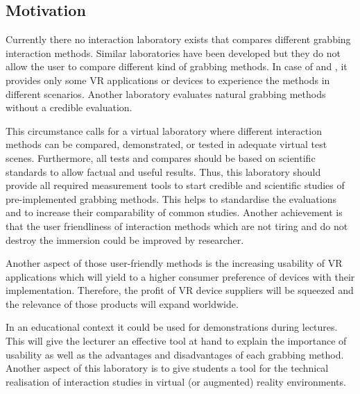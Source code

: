 \subsection{Motivation}\label{sec:Motivation}
Currently there no interaction laboratory exists that compares different grabbing interaction methods. Similar laboratories \cite{lin2016towards}\cite{website:TU}\cite{website:steam} have been developed but they do not allow the user to compare different kind of grabbing methods. In case of \cite{website:steam} and \cite{website:TU}, it provides only some VR applications or devices to experience the methods in different scenarios. Another \cite{lin2016towards} laboratory evaluates natural grabbing methods without a credible evaluation.
  
This circumstance calls for a virtual laboratory where different interaction methods can be compared, demonstrated, or tested in adequate virtual test scenes. Furthermore, all tests and compares should be based on scientific standards to allow factual and useful results. Thus, this laboratory should provide all required measurement tools to start credible and scientific studies of pre-implemented grabbing methods. This helps to standardise the evaluations and to increase their comparability of common studies. Another achievement is that the user friendliness of interaction methods which are not tiring and do not destroy the immersion could be improved by researcher. 

Another aspect of those user-friendly methods is the increasing usability of VR applications which will yield to a higher consumer preference of devices with their implementation. Therefore, the profit of VR device suppliers will be squeezed and the relevance of those products will expand worldwide. 

In an educational context it could be used for demonstrations during lectures. This will give the lecturer an effective tool at hand to explain the importance of usability as well as the advantages and disadvantages of each grabbing method. Another aspect of this laboratory is to give students a tool for the technical realisation of interaction studies in virtual (or augmented) reality environments.

